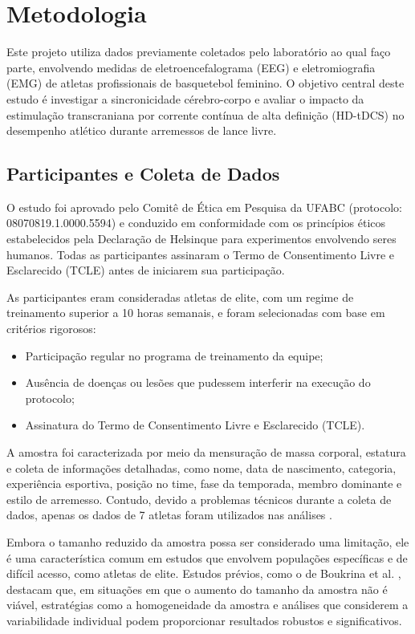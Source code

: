 \chapter{Metodologia}
\label{chap:metodologia}

Este projeto utiliza dados previamente coletados pelo laboratório ao qual faço parte, envolvendo medidas de eletroencefalograma (EEG) e eletromiografia (EMG) de atletas profissionais de basquetebol feminino. O objetivo central deste estudo é investigar a sincronicidade cérebro-corpo e avaliar o impacto da estimulação transcraniana por corrente contínua de alta definição (HD-tDCS) no desempenho atlético durante arremessos de lance livre.

\section{Participantes e Coleta de Dados}

O estudo foi aprovado pelo Comitê de Ética em Pesquisa da UFABC (protocolo: 08070819.1.0000.5594) e conduzido em conformidade com os princípios éticos estabelecidos pela Declaração de Helsinque para experimentos envolvendo seres humanos. Todas as participantes assinaram o Termo de Consentimento Livre e Esclarecido (TCLE) antes de iniciarem sua participação.

As participantes eram consideradas atletas de elite, com um regime de treinamento superior a 10 horas semanais, e foram selecionadas com base em critérios rigorosos:
\begin{itemize}
    \item Participação regular no programa de treinamento da equipe;
    \item Ausência de doenças ou lesões que pudessem interferir na execução do protocolo;
    \item Assinatura do Termo de Consentimento Livre e Esclarecido (TCLE).
\end{itemize}

A amostra foi caracterizada por meio da mensuração de massa corporal, estatura e coleta de informações detalhadas, como nome, data de nascimento, categoria, experiência esportiva, posição no time, fase da temporada, membro dominante e estilo de arremesso. Contudo, devido a problemas técnicos durante a coleta de dados, apenas os dados de 7 atletas foram utilizados nas análises \cite{moscaleski2022}.

Embora o tamanho reduzido da amostra possa ser considerado uma limitação, ele é uma característica comum em estudos que envolvem populações específicas e de difícil acesso, como atletas de elite. Estudos prévios, como o de Boukrina et al. \cite{boukrina2020}, destacam que, em situações em que o aumento do tamanho da amostra não é viável, estratégias como a homogeneidade da amostra e análises que considerem a variabilidade individual podem proporcionar resultados robustos e significativos.

